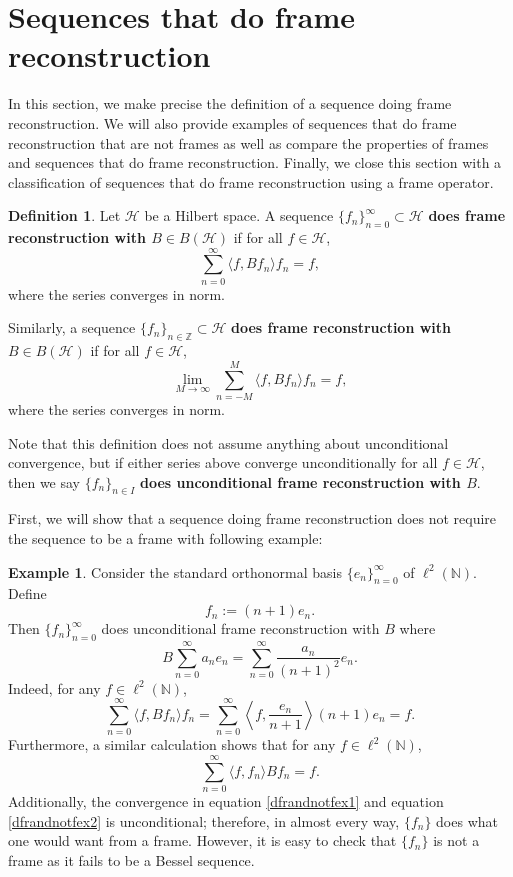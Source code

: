 \documentclass[11pt]{amsart}
\theoremstyle{definition}
\newtheorem{def_n}[thm]{Definition}
\newtheorem{ex}[thm]{Example}
\numberwithin{equation}{section}
\newcommand{\Hcal}{\mathcal{H}} %
\newcommand{\N}{\mathbb{N}}
\begin{document}
\section{Sequences that do frame reconstruction}\label{s3}
In this section, we make precise the definition of a sequence doing frame reconstruction. We will also provide examples of sequences that do frame reconstruction that are not frames as well as compare the properties of frames and sequences that do frame reconstruction. Finally, we close this section with a classification of sequences that do frame reconstruction using a frame operator.
\begin{def_n}
Let $\Hcal$ be a Hilbert space. A sequence \(\{f_n\}_{n=0}^\infty \subset \Hcal\) \textbf{does frame reconstruction with $B\in B(\Hcal)$} if for all \(f \in \Hcal\),
\[
\sum_{n=0}^\infty \langle f, Bf_n \rangle f_n = f,
\]
where the series converges in norm. 

Similarly, a sequence \(\{f_n\}_{n\in \mathbb{Z}} \subset \Hcal\) \textbf{does frame reconstruction with $B\in B(\Hcal)$} if for all \(f \in \Hcal\),
\[
\lim_{M\to \infty}\sum_{n=-M}^{M} \langle f, Bf_n \rangle f_n = f,
\]
where the series converges in norm.

Note that this definition does not assume anything about unconditional convergence, but if either series above converge unconditionally for all $f\in \Hcal$, then we say $\{f_{n}\}_{n\in I}$ \textbf{does unconditional frame reconstruction with $B$}.
\end{def_n}
First, we will show that a sequence doing frame reconstruction does not require the sequence to be a frame with following example:
\begin{ex}\label{firstnonframeex}
Consider the standard orthonormal basis \(\{e_n\}_{n=0}^\infty\) of \(\ell^2(\N)\). Define
\[
f_n := (n+1) e_n.
\]
Then \(\{f_n\}_{n=0}^\infty\) does unconditional frame reconstruction with $B$ where
$$B\sum_{n=0}^{\infty}a_{n}e_{n}=\sum_{n=0}^\infty \frac{a_n}{(n+1)^2} e_n.$$
Indeed, for any \(f \in \ell^2(\N)\),
\begin{equation}\label{dfrandnotfex1}
\sum_{n=0}^\infty \langle f, Bf_n \rangle f_n = \sum_{n=0}^\infty \left\langle f, \frac{e_n}{n+1} \right \rangle (n+1 )e_n=f.\end{equation}
Furthermore, a similar calculation shows that for any \(f \in \ell^2(\N)\),
\begin{equation}\label{dfrandnotfex2}
\sum_{n=0}^\infty \langle f, f_n \rangle Bf_n =f.\end{equation}
Additionally, the convergence in equation \eqref{dfrandnotfex1} and equation \eqref{dfrandnotfex2} is unconditional; therefore, in almost every way, $\{f_{n}\}$ does what one would want from a frame. However, it is easy to check that $\{f_{n}\}$ is not a frame as it fails to be a Bessel sequence.
\end{ex}
\end{document}
